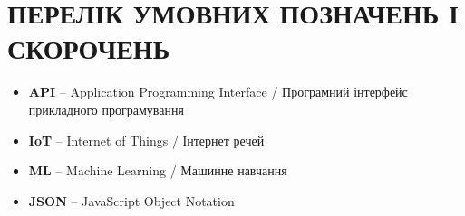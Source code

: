 \chapter*{ПЕРЕЛІК УМОВНИХ ПОЗНАЧЕНЬ І СКОРОЧЕНЬ}

\begin{itemize}
    \item \textbf{API} -- Application Programming Interface / Програмний інтерфейс прикладного програмування
    \item \textbf{IoT} -- Internet of Things / Інтернет речей
    \item \textbf{ML} -- Machine Learning / Машинне навчання
    \item \textbf{JSON} -- JavaScript Object Notation
\end{itemize}
\newpage
